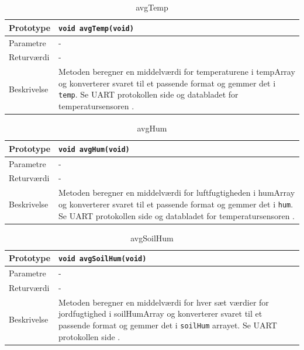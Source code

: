 
\begin{table}[h]
\begin{tabularx}{\textwidth}{| >{\raggedright\arraybackslash}p{2.5 cm} | >{\raggedright\arraybackslash}X |} \hline
Prototype & \texttt{void avgTemp(void)} \\\hline
Parametre & - \\\hline
Returværdi & - \\\hline
Beskrivelse & Metoden beregner en middelværdi for temperaturene i tempArray og konverterer svaret til et passende format og gemmer det i \texttt{temp}. Se UART protokollen side \pageref{UART_Protokol} og databladet for temperatursensoren \cite{lib:TempHum_I2C}.  \\ \hline
\end{tabularx}
\caption{avgTemp}
\label{table:avgTemp}
\end{table}


\begin{table}[h]
\begin{tabularx}{\textwidth}{| >{\raggedright\arraybackslash}p{2.5 cm} | >{\raggedright\arraybackslash}X |} \hline
Prototype & \texttt{void avgHum(void)} \\\hline
Parametre & - \\\hline
Returværdi & - \\\hline
Beskrivelse & Metoden beregner en middelværdi for luftfugtigheden i humArray og konverterer svaret til et passende format og gemmer det i \texttt{hum}. Se UART protokollen side \pageref{UART_Protokol} og databladet for temperatursensoren \cite{lib:TempHum_I2C}.  \\ \hline
\end{tabularx}
\caption{avgHum}
\label{table:avgHum}
\end{table}


\begin{table}[h]
\begin{tabularx}{\textwidth}{| >{\raggedright\arraybackslash}p{2.5 cm} | >{\raggedright\arraybackslash}X |} \hline
Prototype & \texttt{void avgSoilHum(void)} \\\hline
Parametre & - \\\hline
Returværdi & - \\\hline
Beskrivelse & Metoden beregner en middelværdi for hver sæt værdier for jordfugtighed i soilHumArray og konverterer svaret til et passende format og gemmer det i \texttt{soilHum} arrayet. Se UART protokollen side \pageref{UART_Protokol}.  \\ \hline
\end{tabularx}
\caption{avgSoilHum}
\label{table:avgSoilHum}
\end{table}

